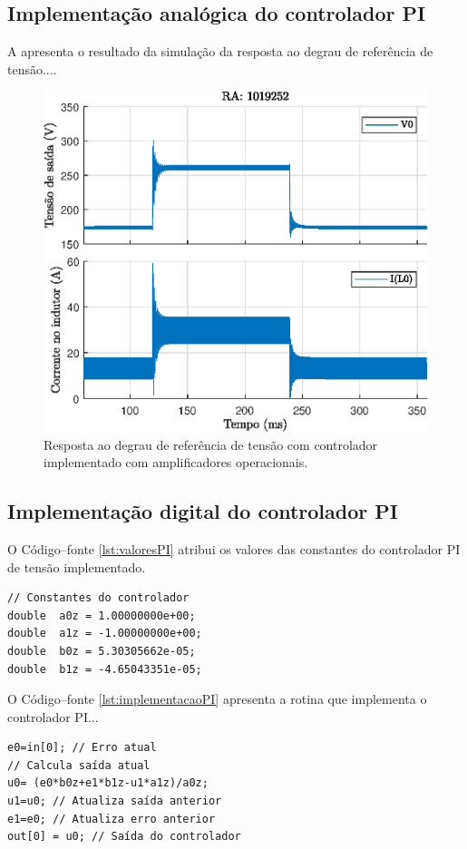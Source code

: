 \subsection{Implementação analógica do controlador PI}




A  apresenta o resultado da simulação da resposta ao degrau de referência de tensão....

\begin{figure}[!ht]
	\centering
	\includegraphics[width=0.9\linewidth]{Figs/Boost1malhaAmpOp}
	\caption{Resposta ao degrau de referência de tensão com controlador implementado com amplificadores operacionais.}
	\label{fig:Boost1malhaAmpOp}
\end{figure}


\subsection{Implementação digital do controlador PI}

O Código--fonte \ref{lst:valoresPI} atribui os valores das constantes do controlador PI de tensão implementado.
\begin{lstlisting}[caption={Parâmetros do controlador PI digital de tensão.},label={lst:valoresPI}]
// Constantes do controlador
double  a0z = 1.00000000e+00;
double  a1z = -1.00000000e+00;
double  b0z = 5.30305662e-05;
double  b1z = -4.65043351e-05;
\end{lstlisting}
O Código--fonte \ref{lst:implementacaoPI} apresenta a rotina que implementa o controlador PI...
\begin{lstlisting}[caption={Implementação do controlador PI digital de tensão.},label={lst:implementacaoPI}]
e0=in[0]; // Erro atual
// Calcula saída atual 
u0= (e0*b0z+e1*b1z-u1*a1z)/a0z; 
u1=u0; // Atualiza saída anterior
e1=e0; // Atualiza erro anterior    
out[0] = u0; // Saída do controlador
\end{lstlisting}


